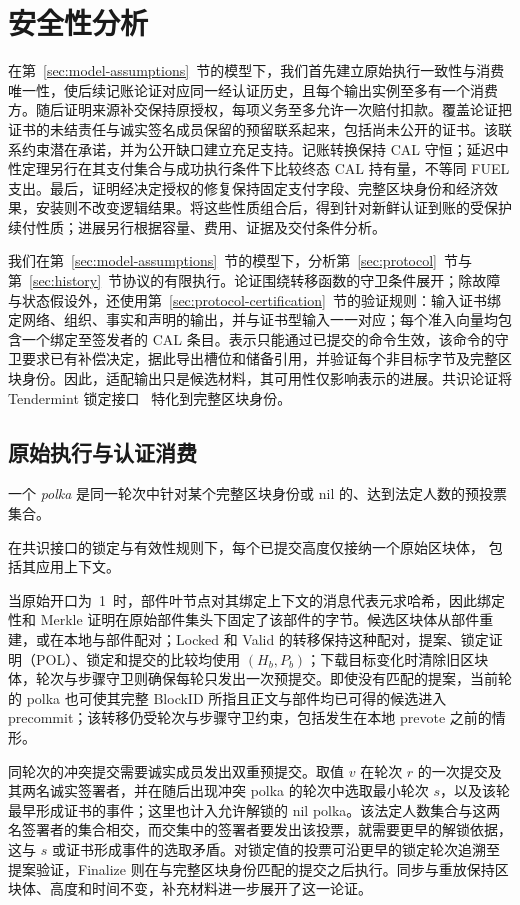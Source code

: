 \section{安全性分析}
\label{sec:security}

在第~\ref{sec:model-assumptions}~节的模型下，我们首先建立原始执行一致性与消费唯一性，使后续记账论证对应同一经认证历史，且每个输出实例至多有一个消费方。随后证明来源补交保持原授权，每项义务至多允许一次赔付扣款。覆盖论证把证书的未结责任与诚实签名成员保留的预留联系起来，包括尚未公开的证书。该联系约束潜在承诺，并为公开缺口建立充足支持。记账转换保持 CAL 守恒；延迟中性定理另行在其支付集合与成功执行条件下比较终态 CAL 持有量，不等同 FUEL 支出。最后，证明经决定授权的修复保持固定支付字段、完整区块身份和经济效果，安装则不改变逻辑结果。将这些性质组合后，得到针对新鲜认证到账的受保护续付性质；进展另行根据容量、费用、证据及交付条件分析。

我们在第~\ref{sec:model-assumptions}~节的模型下，分析第~\ref{sec:protocol}~节与第~\ref{sec:history}~节协议的有限执行。论证围绕转移函数的守卫条件展开；除故障与状态假设外，还使用第~\ref{sec:protocol-certification}~节的验证规则：输入证书绑定网络、组织、事实和声明的输出，并与证书型输入一一对应；每个准入向量均包含一个绑定至签发者的 CAL 条目。表示只能通过已提交的命令生效，该命令的守卫要求已有补偿决定，据此导出槽位和储备引用，并验证每个非目标字节及完整区块身份。因此，适配输出只是候选材料，其可用性仅影响表示的进展。共识论证将 Tendermint 锁定接口~\cite{tendermint} 特化到完整区块身份。

\subsection{原始执行与认证消费}
\label{sec:security-identity}

一个 \emph{polka} 是同一轮次中针对某个完整区块身份或 nil 的、达到法定人数的预投票集合。

\begin{lemma}[原始执行的一致性]
\label{lem:security-original}
在共识接口的锁定与有效性规则下，每个已提交高度仅接纳一个原始区块体，
包括其应用上下文。
\end{lemma}
\begin{IEEEproof}
当原始开口为~1~时，部件叶节点对其绑定上下文的消息代表元求哈希，因此绑定性和 Merkle 证明在原始部件集头下固定了该部件的字节。候选区块体从部件重建，或在本地与部件配对；Locked 和 Valid 的转移保持这种配对，提案、锁定证明（POL）、锁定和提交的比较均使用 $(H_b,P_b)$；下载目标变化时清除旧区块体，轮次与步骤守卫则确保每轮只发出一次预提交。即使没有匹配的提案，当前轮的 polka 也可使其完整 BlockID 所指且正文与部件均已可得的候选进入 precommit；该转移仍受轮次与步骤守卫约束，包括发生在本地 prevote 之前的情形。

同轮次的冲突提交需要诚实成员发出双重预提交。取值 $v$ 在轮次 $r$ 的一次提交及其两名诚实签署者，并在随后出现冲突 polka 的轮次中选取最小轮次 $s$，以及该轮最早形成证书的事件；这里也计入允许解锁的 nil polka。该法定人数集合与这两名签署者的集合相交，而交集中的签署者要发出该投票，就需要更早的解锁依据，这与 $s$ 或证书形成事件的选取矛盾。对锁定值的投票可沿更早的锁定轮次追溯至提案验证，Finalize 则在与完整区块身份匹配的提交之后执行。同步与重放保持区块体、高度和时间不变，补充材料进一步展开了这一论证。
\end{IEEEproof}

